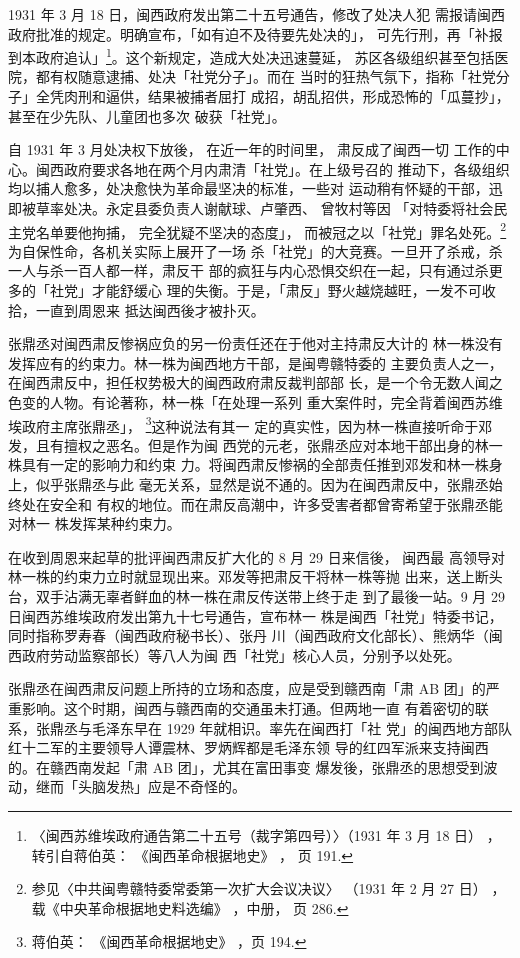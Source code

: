 1931 年 3 月 18 日，闽西政府发出第二十五号通告，修改了处决人犯
需报请闽西政府批准的规定。明确宣布，「如有迫不及待要先处决的」，
可先行刑，再「补报到本政府追认」\footnote{ 〈闽西苏维埃政府通告第二十五号（裁字第四号）〉（1931 年 3 月 18 日）
，转引自蒋伯英： 《闽西革命根据地史》 ， 页 191.}。这个新规定，造成大处决迅速蔓延，
苏区各级组织甚至包括医院，都有权随意逮捕、处决「社党分子」。而在
当时的狂热气氛下，指称「社党分子」全凭肉刑和逼供，结果被捕者屈打
成招，胡乱招供，形成恐怖的「瓜蔓抄」，甚至在少先队、儿童团也多次
破获「社党」。

自 1931 年 3 月处决权下放後，
在近一年的时间里，
肃反成了闽西一切
工作的中心。闽西政府要求各地在两个月内肃清「社党」。在上级号召的
推动下，各级组织均以捕人愈多，处决愈快为革命最坚决的标准，一些对
运动稍有怀疑的干部，迅即被草率处决。永定县委负责人谢献球、卢肇西、
曾牧村等因
「对特委将社会民主党名单要他拘捕，
完全犹疑不坚决的态度」，
而被冠之以「社党」罪名处死。\footnote{ 参见〈中共闽粤赣特委常委第一次扩大会议决议〉
（1931 年 2 月 27 日）
，载《中央革命根据地史料选编》
，中册，
页 286.} 为自保性命，各机关实际上展开了一场
杀「社党」的大竞赛。一旦开了杀戒，杀一人与杀一百人都一样，肃反干
部的疯狂与内心恐惧交织在一起，只有通过杀更多的「社党」才能舒缓心
理的失衡。于是，「肃反」野火越烧越旺，一发不可收拾，一直到周恩来
抵达闽西後才被扑灭。

张鼎丞对闽西肃反惨祸应负的另一份责任还在于他对主持肃反大计的
林一株没有发挥应有的约束力。林一株为闽西地方干部，是闽粤赣特委的
主要负责人之一，在闽西肃反中，担任权势极大的闽西政府肃反裁判部部
长，是一个令无数人闻之色变的人物。有论著称，林一株「在处理一系列
重大案件时，完全背着闽西苏维埃政府主席张鼎丞」， \footnote{ 蒋伯英：
《闽西革命根据地史》
，页 194.}这种说法有其一
定的真实性，因为林一株直接听命于邓发，且有擅权之恶名。但是作为闽
西党的元老，张鼎丞应对本地干部出身的林一株具有一定的影响力和约束
力。将闽西肃反惨祸的全部责任推到邓发和林一株身上，似乎张鼎丞与此
毫无关系，显然是说不通的。因为在闽西肃反中，张鼎丞始终处在安全和
有权的地位。而在肃反高潮中，许多受害者都曾寄希望于张鼎丞能对林一
株发挥某种约束力。
 
在收到周恩来起草的批评闽西肃反扩大化的 8 月 29 日来信後，
闽西最
高领导对林一株的约束力立时就显现出来。邓发等把肃反干将林一株等抛
出来，送上断头台，双手沾满无辜者鲜血的林一株在肃反传送带上终于走
到了最後一站。9 月 29 日闽西苏维埃政府发出第九十七号通告，宣布林一
株是闽西「社党」特委书记，同时指称罗寿春（闽西政府秘书长）、张丹
川（闽西政府文化部长）、熊炳华（闽西政府劳动监察部长）等八人为闽
西「社党」核心人员，分别予以处死。
 
张鼎丞在闽西肃反问题上所持的立场和态度，应是受到赣西南「肃 AB
团」的严重影响。这个时期，闽西与赣西南的交通虽未打通。但两地一直
有着密切的联系，张鼎丞与毛泽东早在 1929 年就相识。率先在闽西打「社
党」的闽西地方部队红十二军的主要领导人谭震林、罗炳辉都是毛泽东领
导的红四军派来支持闽西的。在赣西南发起「肃 AB 团」，尤其在富田事变
爆发後，张鼎丞的思想受到波动，继而「头脑发热」应是不奇怪的。
 
